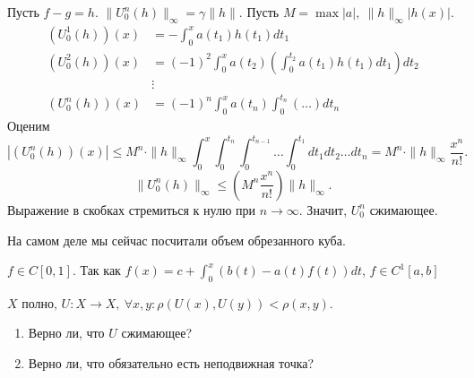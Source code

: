 \begin{ex}
\begin{enumerate}
	    Пусть $ f-g= h$.  $ \| U_0^{n}(h)  \| _{\infty} = \gamma \| h \| $.
	    Пусть $ M= \max \lvert a \rvert, ~ \| h \| _{\infty} \left| h(x) \right|  $.
	    \begin{align*}
		\left( U_0^{1}(h) \right) (x) & = -\int_{0}^{x} a(t_1)h(t_1) dt_1\\
		\left( U_0^{2}(h) \right) (x) & = (-1)^{2}\int_{0}^{x} a(t_2)\left( \int_{0}^{t_2} a(t_1)h(t_1) dt_1  \right) dt_2 \\
					      & \vdots
					      \\
		\left( U_0^{n}(h) \right) (x) &= (-1)^{n} \int_{0}^{x} a(t_n) \int_{0}^{t_n} \left( \ldots  \right)  dt_n
	    \end{align*}
	    Оценим
	    \[
		\left| \left(U_0^{n}(h)\right)(x) \right|  \le M^{n}\cdot \| h \| _{\infty} \int_{0}^{x} \int_{0}^{t_n} \int_{0}^{t_{n-1}} \ldots \int_{0}^{t_1} dt_1 dt_2 \ldots dt_n = M^{n} \cdot  \|  h \| _{\infty} \frac{x^{n}}{n!}
	    .\]
	    \[
		\| U_0^{n}(h)  \| _{\infty} \le \left( M^{n} \frac{x^{n}}{n!} \right) \| h \| _{\infty}
	    .\]
	    Выражение в скобках стремиться к нулю при $ n \to  \infty$. Значит, $ U_0^{n}$ сжимающее.
	    \begin{note}
		На самом деле мы сейчас посчитали объем обрезанного куба.
	    \end{note}
	    $ f \in C[0,1]$.
	    Так как $ f(x) = c+ \int_{0}^{x} (b(t) -a(t)f(t))dt  $, $ f \in C^{1}[a, b]$
    \end{enumerate}
\end{ex}
\begin{prac}
    $ X$ полно, $ U: X \to  X, ~ \forall x, y\colon\rho(U(x), U(y)) < \rho(x, y)$.
    \begin{enumerate}
	\item  Верно ли, что $ U$ сжимающее?
	\item Верно ли, что обязательно есть неподвижная точка?
    \end{enumerate}
\end{prac}
